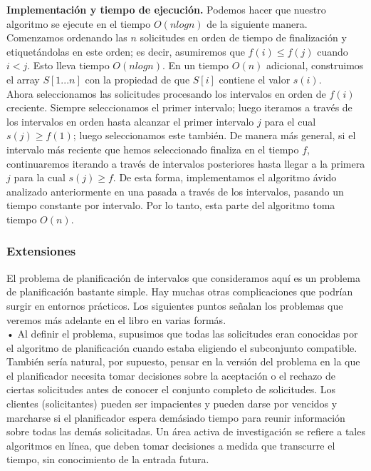 \documentclass[a4paper, 12pt]{book}
\theoremstyle{dotless}
\begin{document}
\textbf{Implementación y tiempo de ejecución.} Podemos hacer que nuestro algoritmo se ejecute en el tiempo $O(nlogn)$ de la siguiente manera. Comenzamos ordenando las $n$ solicitudes en orden de tiempo de finalización y etiquetándolas en este orden; es decir, asumiremos que $f(i) ≤ f(j)$ cuando $i<j$. Esto lleva tiempo $O(nlogn)$. En un tiempo $O(n)$ adicional, construimos el array $S[1...n]$ con la propiedad de que $S[i]$ contiene el valor $s(i)$.\\

Ahora seleccionamos las solicitudes procesando los intervalos en orden de $f(i)$ creciente. Siempre seleccionamos el primer intervalo; luego iteramos a través de los intervalos en orden hasta alcanzar el primer intervalo $j$ para el cual $s(j) ≥ f(1)$; luego seleccionamos este también. De manera más general, si el intervalo más reciente que hemos seleccionado finaliza en el tiempo $f$, continuaremos iterando a través de intervalos posteriores hasta llegar a la primera $j$ para la cual $s(j) ≥ f$. De esta forma, implementamos el algoritmo ávido analizado anteriormente en una pasada a través de los intervalos, pasando un tiempo constante por intervalo. Por lo tanto, esta parte del algoritmo toma tiempo $O(n)$.\\

\subsubsection*{Extensiones}

El problema de planificación de intervalos que consideramos aquí es un problema de planificación bastante simple. Hay muchas otras complicaciones que podrían surgir en entornos prácticos. Los siguientes puntos señalan los problemas que veremos más adelante en el libro en varias formás.\\

    • Al definir el problema, supusimos que todas las solicitudes eran conocidas por el algoritmo de planificación cuando estaba eligiendo el subconjunto compatible. También sería natural, por supuesto, pensar en la versión del problema en la que el planificador necesita tomar decisiones sobre la aceptación o el rechazo de ciertas solicitudes antes de conocer el conjunto completo de solicitudes. Los clientes (solicitantes) pueden ser impacientes y pueden darse por vencidos y marcharse si el planificador espera demásiado tiempo para reunir información sobre todas las demás solicitadas. Un área activa de investigación se refiere a tales algoritmos en línea, que deben tomar decisiones a medida que transcurre el tiempo, sin conocimiento de la entrada futura.\\
\end{document}
